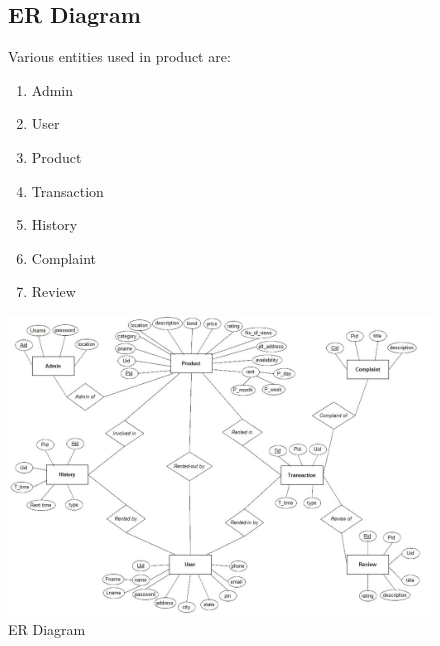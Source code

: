 \documentclass[11pt]{report}
\begin{document}
\begin{figure}[h]   
\subsection{ER Diagram}
Various entities used in product are:
\begin{enumerate}
\item{Admin}
\item{User}
\item{Product}
\item{Transaction}
\item{History}
\item{Complaint}
\item{Review}
\end{enumerate}
  \centering
    \includegraphics[width=7in]{erdgm.jpg} 
	\caption{ER Diagram}
\end{figure}
\end{document}
